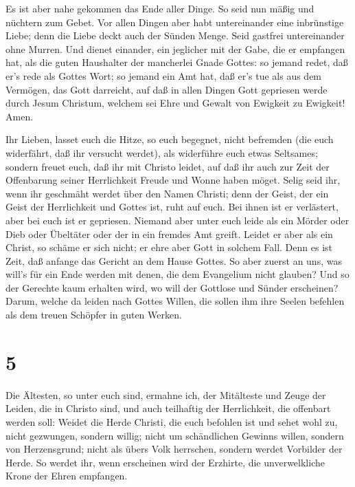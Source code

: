  Es ist aber nahe gekommen das Ende aller Dinge.
 So seid nun mäßig und nüchtern zum Gebet. Vor allen Dingen
aber habt untereinander eine inbrünstige Liebe; denn die Liebe deckt
auch der Sünden Menge.  Seid gastfrei untereinander ohne
Murren.  Und dienet einander, ein jeglicher mit der Gabe,
die er empfangen hat, als die guten Haushalter der mancherlei Gnade
Gottes:  so jemand redet, daß er's rede als Gottes Wort; so
jemand ein Amt hat, daß er's tue als aus dem Vermögen, das Gott
darreicht, auf daß in allen Dingen Gott gepriesen werde durch Jesum
Christum, welchem sei Ehre und Gewalt von Ewigkeit zu Ewigkeit! Amen.

 Ihr Lieben, lasset euch die Hitze, so euch begegnet, nicht
befremden (die euch widerfährt, daß ihr versucht werdet), als widerführe
euch etwas Seltsames;  sondern freuet euch, daß ihr mit
Christo leidet, auf daß ihr auch zur Zeit der Offenbarung seiner
Herrlichkeit Freude und Wonne haben möget.  Selig seid ihr,
wenn ihr geschmäht werdet über den Namen Christi; denn der Geist, der
ein Geist der Herrlichkeit und Gottes ist, ruht auf euch. Bei ihnen ist
er verlästert, aber bei euch ist er gepriesen.  Niemand
aber unter euch leide als ein Mörder oder Dieb oder Übeltäter oder der
in ein fremdes Amt greift.  Leidet er aber als ein Christ,
so schäme er sich nicht; er ehre aber Gott in solchem Fall.
 Denn es ist Zeit, daß anfange das Gericht an dem Hause
Gottes. So aber zuerst an uns, was will's für ein Ende werden mit denen,
die dem Evangelium nicht glauben?  Und so der Gerechte kaum
erhalten wird, wo will der Gottlose und Sünder erscheinen? 
Darum, welche da leiden nach Gottes Willen, die sollen ihm ihre Seelen
befehlen als dem treuen Schöpfer in guten Werken.

\hypertarget{section-4}{%
\section{5}\label{section-4}}

 Die Ältesten, so unter euch sind, ermahne ich, der
Mitälteste und Zeuge der Leiden, die in Christo sind, und auch
teilhaftig der Herrlichkeit, die offenbart werden soll: 
Weidet die Herde Christi, die euch befohlen ist und sehet wohl zu, nicht
gezwungen, sondern willig; nicht um schändlichen Gewinns willen, sondern
von Herzensgrund;  nicht als übers Volk herrschen, sondern
werdet Vorbilder der Herde.  So werdet ihr, wenn erscheinen
wird der Erzhirte, die unverwelkliche Krone der Ehren empfangen.

